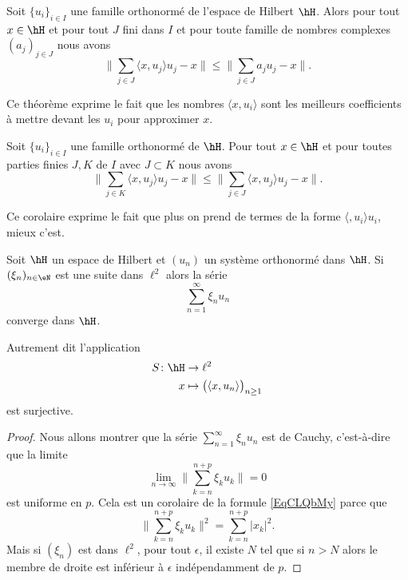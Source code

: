 \begin{theorem} \label{ThooRArDp}
	Soit \( \{ u_i \}_{i\in I}\) une famille orthonormé de l'espace de Hilbert \( \hH\). Alors pour tout \( x\in \hH\) et pour tout \( J\) fini dans \( I\) et pour toute famille de nombres complexes  \( (a_j)_{j\in J}\) nous avons
	\begin{equation}
		\| \sum_{j\in J}\langle x, u_j\rangle u_j-x \|\leq \| \sum_{j\in J}a_ju_j-x \|.
	\end{equation}
\end{theorem}
Ce théorème exprime le fait que les nombres \( \langle x, u_i\rangle \) sont les meilleurs coefficients à mettre devant les \( u_i\) pour approximer \( x\).

\begin{corollary}
	Soit \( \{ u_i \}_{i\in I}\) une famille orthonormé de \( \hH\). Pour tout \( x\in \hH\) et pour toutes parties finies \( J,K\) de \( I\) avec \( J\subset K\) nous avons
	\begin{equation}
		\| \sum_{j\in K}\langle x, u_j\rangle u_j-x \|\leq \| \sum_{j\in J}\langle x, u_j\rangle u_j-x \|.
	\end{equation}
\end{corollary}
Ce corolaire exprime le fait que plus on prend de termes de la forme \( \langle , u_i\rangle u_i\), mieux c'est.

\begin{proposition}     \label{PropzaKXHq}
	Soit \( \hH\) un espace de Hilbert et \( (u_n)\) un système orthonormé dans \( \hH\). Si \( (\xi_n)_{n\in \eN}\) est une suite dans \( \ell^2\) alors la série
	\begin{equation}
		\sum_{n=1}^{\infty}\xi_nu_n
	\end{equation}
	converge dans \( \hH\).

	Autrement dit l'application
	\begin{equation}
		\begin{aligned}
			S\colon \hH & \to \ell^2                                           \\
			x           & \mapsto \big( \langle x, u_n\rangle  \big)_{n\geq 1}
		\end{aligned}
	\end{equation}
	est surjective.
\end{proposition}

\begin{proof}
	Nous allons montrer que la série \( \sum_{n=1}^{\infty}\xi_nu_n\) est de Cauchy, c'est-à-dire que la limite
	\begin{equation}
		\lim_{n\to \infty} \big\| \sum_{k=n}^{n+p}\xi_ku_k \big\|=0
	\end{equation}
	est uniforme en \( p\). Cela est un corolaire de la formule \eqref{EqCLQbMy} parce que
	\begin{equation}
		\big\| \sum_{k=n}^{n+p}\xi_ku_k \big\|^2=\sum_{k=n}^{n+p}| x_k |^2.
	\end{equation}
	Mais si \( (\xi_n)\) est dans \( \ell^2\), pour tout \( \epsilon\), il existe \( N\) tel que si \( n>N\) alors le membre de droite est inférieur à \( \epsilon\) indépendamment de \( p\).
\end{proof}

